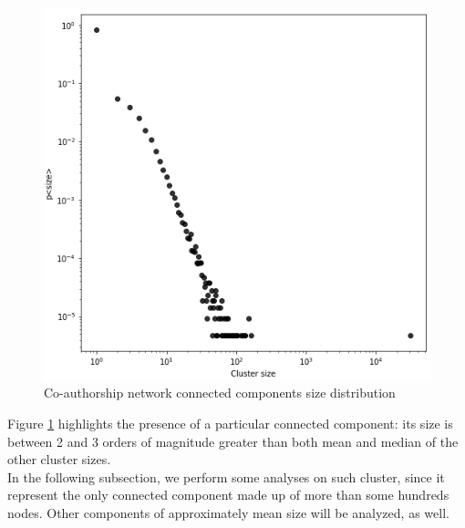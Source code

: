 \documentclass[sigchi]{acmart}
\begin{document}
\begin{figure}[ht]
  \centering
  \includegraphics[width=\linewidth]{report/img/componentDistribution.png}
  \caption{Co-authorship network connected components size distribution}
  \label{fig:componentDistribution}
\end{figure}

Figure \ref{fig:componentDistribution} highlights the presence of a particular connected component: its size is between 2 and 3 orders of magnitude greater than both mean and median of the other cluster sizes. \\
In the following subsection, we perform some analyses on such cluster, since it represent the only connected component made up of more than some hundreds nodes. Other components of approximately mean size will be analyzed, as well.
\end{document}
